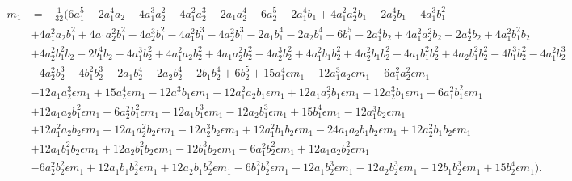 \documentclass[10pt]{article}
\theoremstyle{plain}
\theoremstyle{definition}
\theoremstyle{plain}
\begin{document}
\begin{equation}
 \begin{split}
 m_{1}&= -\frac{1}{32} (6 a_{1}^5 - 2 a_{1}^4 a_{2} - 4 a_{1}^3 a_{2}^2 - 4 a_{1}^2 a_{2}^3 - 
 2 a_{1} a_{2}^4 + 6 a_{2}^5 - 2 a_{1}^4 b_{1} + 4 a_{1}^2 a_{2}^2 b_{1} - 2 a_{2}^4 b_{1} - 
 4 a_{1}^3 b_{1}^2 \\
 &+ 4 a_{1}^2 a_{2} b_{1}^2 + 4 a_{1} a_{2}^2 b_{1}^2 - 4 a_{2}^3 b_{1}^2
 - 
 4 a_{1}^2 b_{1}^3 - 4 a_{2}^2 b_{1}^3 - 2 a_{1} b_{1}^4 - 2 a_{2} b_{1}^4 + 6 b_{1}^5
 - 
 2 a_{1}^4 b_{2} + 4 a_{1}^2 a_{2}^2 b_{2} - 2 a_{2}^4 b_{2} + 4 a_{1}^2 b_{1}^2 b_{2}\\
 &+ 
 4 a_{2}^2 b_{1}^2 b_{2} - 2 b_{1}^4 b_{2} 
 - 4 a_{1}^3 b_{2}^2 + 4 a_{1}^2 a_{2} b_{2}^2
 + 
 4 a_{1} a_{2}^2 b_{2}^2 - 4 a_{2}^3 b_{2}^2 + 4 a_{1}^2 b_{1} b_{2}^2 + 4 a_{2}^2 b_{1} b_{2}^2 + 
 4 a_{1} b_{1}^2 b_{2}^2 + 4 a_{2} b_{1}^2 b_{2}^2 - 4 b_{1}^3 b_{2}^2 - 4 a_{1}^2 b_{2}^3\\
 &- 
 4 a_{2}^2 b_{2}^3 - 4 b_{1}^2 b_{2}^3 - 2 a_{1} b_{2}^4 - 2 a_{2} b_{2}^4 - 2 b_{1} b_{2}^4 + 
 6 b_{2}^5 + 15 a_{1}^4 \epsilon m_{1} - 12 a_{1}^3 a_{2} \epsilon m_{1} - 6 a_{1}^2 a_{2}^2 \epsilon m_{1} \\
 &- 
 12 a_{1} a_{2}^3 \epsilon m_{1} + 15 a_{2}^4 \epsilon m_{1} - 12 a_{1}^3 b_{1} \epsilon m_{1} 
 + 
 12 a_{1}^2 a_{2} b_{1} \epsilon m_{1} + 12 a_{1} a_{2}^2 b_{1} \epsilon m_{1} - 12 a_{2}^3 b_{1} \epsilon m_{1} - 
 6 a_{1}^2 b_{1}^2 \epsilon m_{1}\\
 &+ 12 a_{1} a_{2} b_{1}^2 \epsilon m_{1} - 6 a_{2}^2 b_{1}^2 \epsilon m_{1}- 
 12 a_{1} b_{1}^3 \epsilon m_{1} - 12 a_{2} b_{1}^3 \epsilon m_{1} + 15 b_{1}^4 \epsilon m_{1} - 
 12 a_{1}^3 b_{2} \epsilon m_{1}\\
 &+ 12 a_{1}^2 a_{2} b_{2} \epsilon m_{1} + 12 a_{1} a_{2}^2 b_{2} \epsilon m_{1} - 
 12 a_{2}^3 b_{2} \epsilon m_{1} + 12 a_{1}^2 b_{1} b_{2} \epsilon m_{1} - 24 a_{1} a_{2} b_{1} b_{2} \epsilon m_{1} + 
 12 a_{2}^2 b_{1} b_{2} \epsilon m_{1}\\
 &+ 12 a_{1} b_{1}^2 b_{2} \epsilon m_{1} + 12 a_{2} b_{1}^2 b_{2} \epsilon m_{1}- 
 12 b_{1}^3 b_{2} \epsilon m_{1} - 6 a_{1}^2 b_{2}^2 \epsilon m_{1} + 12 a_{1} a_{2} b_{2}^2 \epsilon m_{1}\\
 &- 
 6 a_{2}^2 b_{2}^2 \epsilon m_{1} + 12 a_{1} b_{1} b_{2}^2 \epsilon m_{1} + 12 a_{2} b_{1} b_{2}^2 \epsilon m_{1} - 
 6 b_{1}^2 b_{2}^2 \epsilon m_{1} - 12 a_{1} b_{2}^3 \epsilon m_{1} - 12 a_{2} b_{2}^3 \epsilon m_{1} - 
 12 b_{1} b_{2}^3 \epsilon m_{1} + 15 b_{2}^4 \epsilon m_{1}).
 \end{split}
\end{equation}
\end{document}
